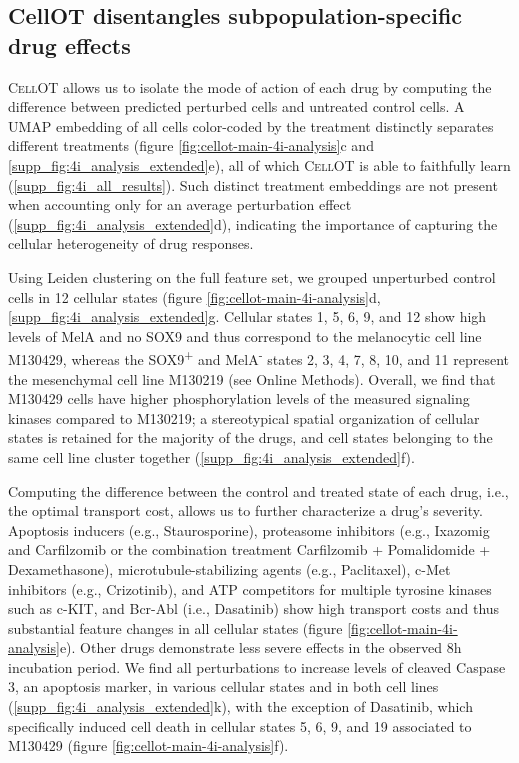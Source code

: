 \subsection{CellOT disentangles subpopulation-specific drug effects}
\textsc{CellOT} allows us to 
isolate the mode of action of each drug by computing the difference between predicted perturbed cells and untreated control cells. %
A UMAP embedding of all cells color-coded by the treatment distinctly separates different treatments (figure \ref{fig:cellot-main-4i-analysis}c and \ref{supp_fig:4i_analysis_extended}e), all of which \textsc{CellOT} is able to faithfully learn (\ref{supp_fig:4i_all_results}).
Such distinct treatment embeddings are not present when accounting only for an average perturbation effect (\ref{supp_fig:4i_analysis_extended}d), indicating the importance of capturing the cellular heterogeneity of drug responses.

Using Leiden clustering on the full feature set, we grouped unperturbed control cells in 12 cellular states (figure \ref{fig:cellot-main-4i-analysis}d, \ref{supp_fig:4i_analysis_extended}g.
Cellular states 1, 5, 6, 9, and 12 show high levels of MelA and no SOX9 and thus correspond to the melanocytic cell line M130429, whereas the SOX9\textsuperscript{+} and MelA\textsuperscript{-} states 2, 3, 4, 7, 8, 10, and 11 represent the mesenchymal cell line M130219 (see Online Methods). Overall, we find that M130429 cells have higher phosphorylation levels of the measured signaling kinases compared to M130219;
a stereotypical spatial organization of cellular states is retained for the majority of the drugs,  and cell states belonging to the same cell line cluster together (\ref{supp_fig:4i_analysis_extended}f). 

Computing the difference between the control and treated state of each drug, i.e., the optimal
transport cost, allows us to further characterize a drug's severity. 
Apoptosis inducers (e.g., Staurosporine), proteasome inhibitors (e.g., Ixazomig and Carfilzomib or the combination treatment Carfilzomib + Pomalidomide + Dexamethasone), microtubule-stabilizing agents (e.g., Paclitaxel), c-Met inhibitors (e.g., Crizotinib), and ATP competitors for multiple tyrosine kinases such as c-KIT, and Bcr-Abl (i.e., Dasatinib) show high transport costs and thus substantial feature changes in all cellular states (figure \ref{fig:cellot-main-4i-analysis}e).
Other drugs demonstrate less severe effects in the observed 8h incubation period. 
We find all perturbations to increase levels of cleaved Caspase 3, an apoptosis marker, in various cellular states and in both cell lines (\ref{supp_fig:4i_analysis_extended}k),
with the exception of Dasatinib, which specifically induced cell death in cellular states 5, 6, 9, and 19 associated to M130429 (figure \ref{fig:cellot-main-4i-analysis}f).


